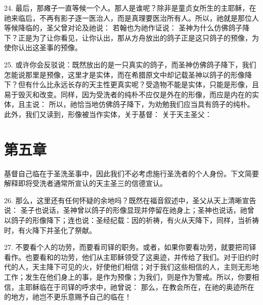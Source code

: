 24. 最后，那瘫子一直等候一个人。那人是谁呢？除非是童贞女所生的主耶稣，在祂来临后，不再有影子逐一医治人，而是真理要医治所有人。所以，祂就是那位人等候降临的，圣父曾对论及祂说： 若翰也为祂作证说： 圣神为什么仿佛鸽子降下？正是为了让你看见，让你认出，那从方舟放出的鸽子正是这只鸽子的预像，为使你认出这圣事的预像。\par

25. 或许你会反驳说：既然放出的是一只真实的鸽子，而圣神仿佛鸽子降下，我们怎能说那里是预像，这里才是实体，而在希腊原文中却记载圣神以鸽子的形像降下？但有什么比永远长存的天主性更真实呢？受造物不能是实体，只能是形像，且易于毁灭和改变。同样，因为受洗者的纯朴不应仅是外在的形像，而应是内在的实体，且主说： 所以，祂恰当地仿佛鸽子降下，为劝勉我们应当具有鸽子的纯朴。此外，我们又读到，形像被当作实体，关于基督： 关于天主圣父：\par


\section{第五章}

基督自己临在于圣洗圣事中，因此我们不必考虑施行圣洗者的个人身份。下文简要解释即将受洗者通常所宣认的天主圣三的信德宣认。\par

26. 那么，这里还有任何怀疑的余地吗？既然在福音叙述中，圣父从天上清晰宣告说： 圣子也说话，圣神曾以鸽子的形像显现并停留在祂身上；圣神也说话，祂曾以鸽子的形像降下；连也说：圣经纪载：因的祈祷，有火从天降下，同样，当祈祷时，有火降下并圣化了祭献。\par

27. 不要看个人的功劳，而要看司铎的职务。或者，如果你要看功劳，就要把司铎看作。也要看和的功劳，他们从主耶稣领受了这奥迹，并传给了我们。对于旧约时代的人，天主降下可见的火，好使他们相信；对于我们这些相信的人，主则无形地工作；发生在他们身上的事，是作为预像；为我们，则是作为警戒。所以，你要相信，主耶稣临在于司铎的呼求中，祂曾说： 那么，在教会所在，在祂的奥迹所在的地方，祂岂不更乐意赐予自己的临在！\par

